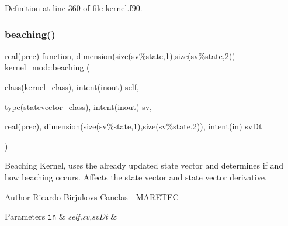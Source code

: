 Definition at line 360 of file kernel.\+f90.


\mbox{\label{namespacekernel__mod_ad243eaeb4e5d667795477e81ce6136c9}} 
\subsubsection{\texorpdfstring{beaching()}{beaching()}}
{\footnotesize\ttfamily real(prec) function, dimension(size(sv\%state,1),size(sv\%state,2)) kernel\+\_\+mod\+::beaching (\begin{DoxyParamCaption}\item[{class(\mbox{\hyperlink{structkernel__mod_1_1kernel__class}{kernel\+\_\+class}}), intent(inout)}]{self,  }\item[{type(statevector\+\_\+class), intent(inout)}]{sv,  }\item[{real(prec), dimension(size(sv\%state,1),size(sv\%state,2)), intent(in)}]{sv\+Dt }\end{DoxyParamCaption})}



Beaching Kernel, uses the already updated state vector and determines if and how beaching occurs. Affects the state vector and state vector derivative. 

\begin{DoxyAuthor}{Author}
Ricardo Birjukovs Canelas -\/ M\+A\+R\+E\+T\+EC 
\end{DoxyAuthor}

\begin{DoxyParams}[1]{Parameters}
\mbox{\tt in}  & {\em self,sv,sv\+Dt} & \\
\hline
\end{DoxyParams}


